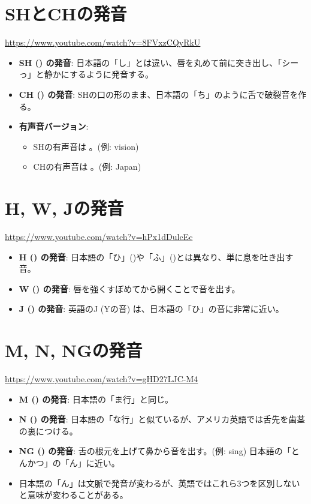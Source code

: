 \documentclass{jlreq}
\begin{document}
\section{SHとCHの発音}
\href{https://www.youtube.com/watch?v=8FVxzCQyRkU}{https://www.youtube.com/watch?v=8FVxzCQyRkU}
\begin{itemize}
    \item \textbf{SH (\textipa{[\textesh]}) の発音}: 日本語の「し」とは違い、唇を丸めて前に突き出し、「シーっ」と静かにするように発音する。
    \item \textbf{CH (\textipa{[t\textesh]}) の発音}: SHの口の形のまま、日本語の「ち」のように舌で破裂音を作る。
    \item \textbf{有声音バージョン}:
    \begin{itemize}
        \item SHの有声音は \textipa{[Z]}。(例: vision)
        \item CHの有声音は \textipa{[dZ]}。(例: Japan)
    \end{itemize}
\end{itemize}

\section{H, W, Jの発音}
\href{https://www.youtube.com/watch?v=hPx1dDulcEc}{https://www.youtube.com/watch?v=hPx1dDulcEc}
\begin{itemize}
    \item \textbf{H (\textipa{[h]}) の発音}: 日本語の「ひ」(\textipa{[]})や「ふ」(\textipa{[]})とは異なり、単に息を吐き出す音。
    \item \textbf{W (\textipa{[w]}) の発音}: 唇を強くすぼめてから開くことで音を出す。
    \item \textbf{J (\textipa{[j]}) の発音}: 英語のJ (Yの音) は、日本語の「ひ」の音に非常に近い。
\end{itemize}

\section{M, N, NGの発音}
\href{https://www.youtube.com/watch?v=gHD27LJC-M4}{https://www.youtube.com/watch?v=gHD27LJC-M4}
\begin{itemize}
    \item \textbf{M (\textipa{[m]}) の発音}: 日本語の「ま行」と同じ。
    \item \textbf{N (\textipa{[n]}) の発音}: 日本語の「な行」と似ているが、アメリカ英語では舌先を歯茎の裏につける。
    \item \textbf{NG (\textipa{[\ng]}) の発音}: 舌の根元を上げて鼻から音を出す。(例: sing) 日本語の「とんかつ」の「ん」に近い。
    \item 日本語の「ん」は文脈で発音が変わるが、英語ではこれら3つを区別しないと意味が変わることがある。
\end{itemize}
\end{document}
